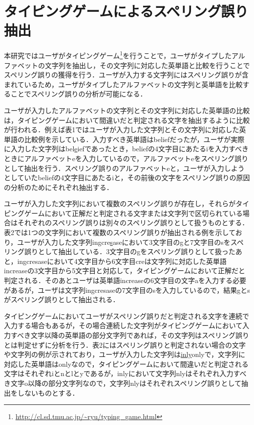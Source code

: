 \chapter{タイピングゲームによるスペリング誤り抽出}
本研究ではユーザがタイピングゲーム\footnote{\url{http://cl.sd.tmu.ac.jp/~ryu/typing_game.html}}を行うことで，ユーザがタイプしたアルファベットの文字列を抽出し，その文字列に対応した英単語と比較を行うことでスペリング誤りの獲得を行う．ユーザが入力する文字列にはスペリング誤りが含まれているため，ユーザがタイプしたアルファベットの文字列と英単語を比較することでスペリング誤りの分析が可能になる．

ユーザが入力したアルファベットの文字列とその文字列に対応した英単語の比較は，タイピングゲームにおいて間違いだと判定される文字を抽出するように比較が行われる．例えば表1ではユーザが入力した文字列とその文字列に対応した英単語の比較例を示している．入力すべき英単語はbeliefだったが，ユーザが実際に入力した文字列はbel\underline{e}iefであったとき，beliefの4文字目にあたるiを入力すべきときにアルファベットeを入力しているので，アルファベットeをスペリング誤りとして抽出を行う．スペリング誤りのアルファベットeと，ユーザが入力しようとしていたbeliefの4文字目にあたるiと，その前後の文字をスペリング誤りの原因の分析のためにそれぞれ抽出する．

ユーザが入力した文字列において複数のスペリング誤りが存在し，それらがタイピングゲームにおいて正解だと判定される文字または文字列で区切られている場合はそれぞれのスペリング誤りは別々のスペリング誤りとして扱うものとする．表2では1つの文字列において複数のスペリング誤りが抽出される例を示しており，ユーザが入力した文字列in\underline{g}cre\underline{s}aseにおいて3文字目のgと7文字目のsをスペリング誤りとして抽出している．3文字目のgをスペリング誤りとして扱ったあと，ingcresaseにおいて4文字目から6文字目creは文字列に対応した英単語increaseの3文字目から5文字目と対応して，タイピングゲームにおいて正解だと判定される．そのあとユーザは英単語increaseの6文字目の文字aを入力する必要があるが，ユーザは文字列ingcresaseの7文字目のsを入力しているので，結果gとsがスペリング誤りとして抽出される．

タイピングゲームにおいてユーザがスペリング誤りだと判定される文字を連続で入力する場合もあるが，その場合連続した文字列がタイピングゲームにおいて入力すべき文字以降の英単語の部分文字列であれば，その文字列はスペリング誤りとは判定せずに分析を行う．表2にはスペリング誤りと判定されない場合の文字や文字列の例が示されており，ユーザが入力した文字列は\underline{inly}onlyで，文字列に対応した英単語はonlyなので，タイピングゲームにおいて間違いだと判定される文字はそれぞれiとnとlとyであるが，inlyにおいて文字列nlyはそれぞれ入力すべき文字o以降の部分文字列なので，文字列nlyはそれぞれスペリング誤りとして抽出をしないものとする．

